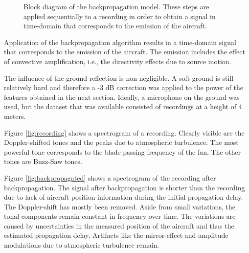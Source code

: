 \begin{figure}[H]
  \centering
{}
  \caption{Block diagram of the backpropagation model. These steps are applied sequentially to a recording in order to obtain a signal in time-domain that corresponds to the emission of the aircraft.}
  \label{fig:backpropagation_block_diagram}
\end{figure}

Application of the backpropagation algorithm results in a time-domain signal
that corresponds to the emission of the aircraft. The emission includes the
effect of convective amplification, i.e., the directivity effects due to source
motion.

The influence of the ground reflection is non-negligible. A soft ground is still
relatively hard and therefore a -3 dB correction was applied to the power of the
features obtained in the next section. Ideally, a microphone on the ground was
used, but the dataset that was available consisted of recordings at a height of
4 meters.

Figure \ref{fig:recording} shows a spectrogram of a recording. Clearly visible
are the Doppler-shifted tones and the peaks due to atmospheric turbulence. The
most powerful tone corresponds to the blade passing frequency of the fan. The
other tones are Buzz-Saw tones.

Figure \ref{fig:backpropagated} shows a spectrogram of the recording after
backpropagation. The signal after backpropagation is shorter than the recording
due to lack of aircraft position information during the initial propagation
delay. The Doppler-shift has mostly been removed. Aside from small variations,
the tonal components remain constant in frequency over time. The variations are
caused by uncertainties in the measured position of the aircraft and thus the
estimated propagation delay. Artifacts like the mirror-effect and amplitude
modulations due to atmospheric turbulence remain.

